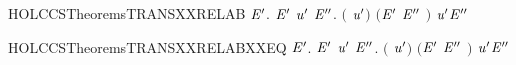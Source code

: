 \newcommand{\HOLCCSTheoremsTRANSXXRECXXEQ}{\UseVerbatim{HOLCCSTheoremsTRANSXXRECXXEQ}}
\begin{SaveVerbatim}{HOLCCSTheoremsTRANSXXRELAB}
\HOLTokenTurnstile{} \HOLSymConst{\HOLTokenForall{}}   \ensuremath{\HOLBoundVar{E}\sp{\prime{}}}.
        \HOLTokenTransBegin{}\HOLTokenTransEnd \ensuremath{\HOLBoundVar{E}\sp{\prime{}}} \HOLSymConst{\HOLTokenImp{}}
     \HOLSymConst{\HOLTokenExists{}}\ensuremath{\HOLBoundVar{u}\sp{\prime{}}} \ensuremath{\HOLBoundVar{E}\sp{\prime{}\prime{}}}.
       \ensuremath{(} \HOLSymConst{\ensuremath{=}}   \ensuremath{\HOLBoundVar{u}\sp{\prime{}}}\ensuremath{)} \HOLSymConst{\HOLTokenConj{}} \ensuremath{(}\ensuremath{\HOLBoundVar{E}\sp{\prime{}}} \HOLSymConst{\ensuremath{=}}  \ensuremath{\HOLBoundVar{E}\sp{\prime{}\prime{}}} \ensuremath{)} \HOLSymConst{\HOLTokenConj{}}  \HOLTokenTransBegin\ensuremath{\HOLBoundVar{u}\sp{\prime{}}}\HOLTokenTransEnd \ensuremath{\HOLBoundVar{E}\sp{\prime{}\prime{}}}
\end{SaveVerbatim}
\newcommand{\HOLCCSTheoremsTRANSXXRELAB}{\UseVerbatim{HOLCCSTheoremsTRANSXXRELAB}}
\begin{SaveVerbatim}{HOLCCSTheoremsTRANSXXRELABXXEQ}
\HOLTokenTurnstile{} \HOLSymConst{\HOLTokenForall{}}   \ensuremath{\HOLBoundVar{E}\sp{\prime{}}}.
        \HOLTokenTransBegin{}\HOLTokenTransEnd \ensuremath{\HOLBoundVar{E}\sp{\prime{}}} \HOLSymConst{\HOLTokenEquiv{}}
     \HOLSymConst{\HOLTokenExists{}}\ensuremath{\HOLBoundVar{u}\sp{\prime{}}} \ensuremath{\HOLBoundVar{E}\sp{\prime{}\prime{}}}.
       \ensuremath{(} \HOLSymConst{\ensuremath{=}}   \ensuremath{\HOLBoundVar{u}\sp{\prime{}}}\ensuremath{)} \HOLSymConst{\HOLTokenConj{}} \ensuremath{(}\ensuremath{\HOLBoundVar{E}\sp{\prime{}}} \HOLSymConst{\ensuremath{=}}  \ensuremath{\HOLBoundVar{E}\sp{\prime{}\prime{}}} \ensuremath{)} \HOLSymConst{\HOLTokenConj{}}  \HOLTokenTransBegin\ensuremath{\HOLBoundVar{u}\sp{\prime{}}}\HOLTokenTransEnd \ensuremath{\HOLBoundVar{E}\sp{\prime{}\prime{}}}
\end{SaveVerbatim}
\newcommand{\HOLCCSTheoremsTRANSXXRELABXXEQ}{\UseVerbatim{HOLCCSTheoremsTRANSXXRELABXXEQ}}
